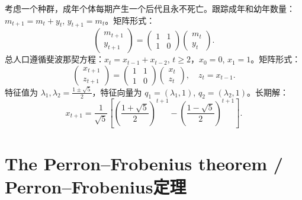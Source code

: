 \begin{translation}
考虑一个种群，成年个体每期产生一个后代且永不死亡。跟踪成年和幼年数量：$m_{t+1} = m_t + y_t$, $y_{t+1} = m_t$。矩阵形式：
\[
\begin{pmatrix} m_{t+1} \\ y_{t+1} \end{pmatrix} = \begin{pmatrix} 1 & 1 \\ 1 & 0 \end{pmatrix} \begin{pmatrix} m_t \\ y_t \end{pmatrix}.
\]
总人口遵循斐波那契方程：$x_t = x_{t-1} + x_{t-2}$, $t \ge 2$，$x_0 = 0$, $x_1 = 1$。矩阵形式：
\[
\begin{pmatrix} x_{t+1} \\ z_{t+1} \end{pmatrix} = \begin{pmatrix} 1 & 1 \\ 1 & 0 \end{pmatrix} \begin{pmatrix} x_t \\ z_t \end{pmatrix}, \quad z_t = x_{t-1}.
\]
特征值为 $\lambda_1, \lambda_2 = \frac{1 \pm \sqrt{5}}{2}$，特征向量为 $q_1 = (\lambda_1, 1)$, $q_2 = (\lambda_2, 1)$。长期解：
\[
x_{t+1} = \frac{1}{\sqrt{5}}\left[\left(\frac{1+\sqrt{5}}{2}\right)^{t+1} - \left(\frac{1-\sqrt{5}}{2}\right)^{t+1}\right].
\]
\end{translation}

\section{The Perron--Frobenius theorem / Perron--Frobenius定理}

